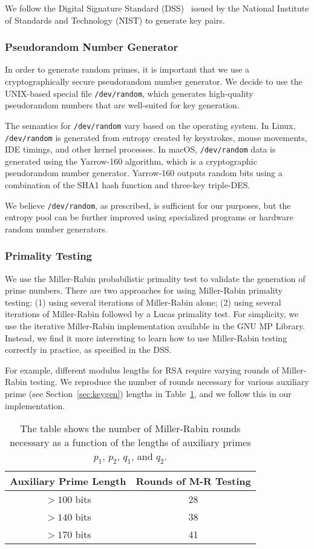 \documentclass[letterpaper]{article}
\begin{document}
We follow the Digital Signature Standard (DSS)~\cite{fips2013186} issued by the National Institute of Standards and Technology (NIST) to generate key pairs.

\subsubsection{Pseudorandom Number Generator}\label{sec:prng}
In order to generate random primes, it is important that we use a cryptographically secure pseudorandom number generator. We decide to use the UNIX-based special file {\tt /dev/random}, which generates high-quality pseudorandom numbers that are well-suited for key generation.

The semantics for {\tt /dev/random} vary based on the operating system. In Linux,  {\tt /dev/random} is generated from entropy created by keystrokes, mouse movements, IDE timings, and other kernel processes. In macOS, {\tt /dev/random} data is generated using the Yarrow-160 algorithm, which is a cryptographic pseudorandom number generator. Yarrow-160 outputs random bits using a combination of the SHA1 hash function and three-key triple-DES.

We believe {\tt /dev/random}, as prescribed, is sufficient for our purposes, but the entropy pool can be further improved using specialized programs or hardware random number generators.

\subsubsection{Primality Testing}

We use the Miller-Rabin probabilistic primality test to validate the generation of prime numbers. There are two approaches for using Miller-Rabin primality testing: (1) using several iterations of Miller-Rabin alone; (2) using several iterations of Miller-Rabin followed by a Lucas primality test. For simplicity, we use the iterative Miller-Rabin implementation available in the GNU MP Library. Instead, we find it more interesting to learn how to use Miller-Rabin testing correctly
in practice, as specified in the DSS.

For example, different modulus lengths for RSA require varying rounds of Miller-Rabin testing. We reproduce the number of rounds necessary for various auxiliary prime (see Section~\ref{sec:keygen}) lengths in Table~\ref{tab:mr}, and we follow this in our implementation.

\begin{table}[h]
\centering
\begin{tabular}{|c|c|} 
 \hline
 Auxiliary Prime Length & Rounds of M-R Testing  \\ \hline
 $>100$ bits & 28 \\ 
 $>140$ bits & 38 \\ 
 $>170$ bits & 41 \\
 \hline
\end{tabular}
\caption{The table shows the number of Miller-Rabin rounds necessary as a function of the lengths of auxiliary primes $p_1$, $p_2$, $q_1$, and $q_2$.}
\label{tab:mr}
\end{table}
\end{document}
